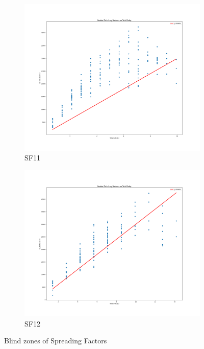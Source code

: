 \begin{figure}[htp!]
    \begin{subfigure}{0.45\linewidth}
        \includegraphics[width=\linewidth]{images/BlindZone5.png}
        \caption{SF11}
    \end{subfigure}
    \hfill
    \begin{subfigure}{0.45\linewidth}
        \includegraphics[width=\linewidth]{images/BlindZone6.png}
        \caption{SF12}
    \end{subfigure}
    \caption{Blind zones of Spreading Factors}
    \label{fig:blindzone collage}
\end{figure}


